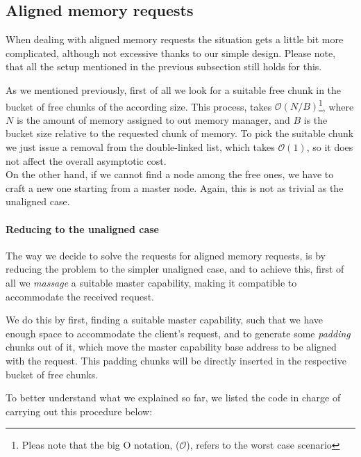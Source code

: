 \documentclass[a4paper,twoside,openright]{report}
\newcommand{\bigO}{\mathcal{O}}
\begin{document}
\subsection{Aligned memory requests}
When dealing with aligned memory requests the situation gets a little bit more complicated, although not excessive thanks to our simple design.
Please note, that all the setup mentioned in the previous subsection still holds for this.

As we mentioned previously, first of all we look for a suitable free chunk in the bucket of free chunks of the according size. This process, takes $\bigO(N/B)$\footnote{Pleas note that the big O notation, ($\bigO$), refers to the worst case scenario}, where $N$ is the amount of memory assigned to out memory manager, and $B$ is the bucket size relative to the requested chunk of memory.
To pick the suitable chunk we just issue a removal from the double-linked list, which takes $\bigO(1)$, so it does not affect the overall asymptotic cost.\\

On the other hand, if we cannot find a node among the free ones, we have to craft a new one starting from a master node. Again, this is not as trivial as the unaligned case.

\paragraph{Reducing to the unaligned case}
The way we decide to solve the requests for aligned memory requests, is by reducing the problem to the simpler unaligned case, and to achieve this, first of all we \textit{massage} a suitable master capability, making it compatible to accommodate the received request.

We do this by first, finding a suitable master capability, such that we have enough space to accommodate the client's request, and to generate some \emph{padding} chunks out of it, which move the master capability base address to be aligned with the request. This padding chunks will be directly inserted in the respective bucket of free chunks.

To better understand what we explained so far, we listed the code in charge of carrying out this procedure below:
\end{document}

